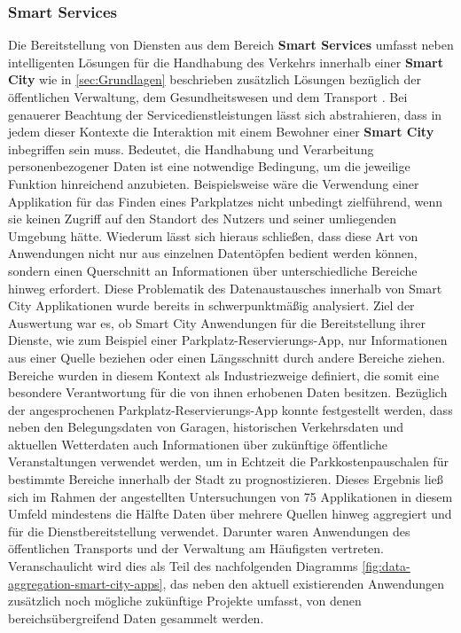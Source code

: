 \subsubsection{Smart Services}
\label{sec:Analyse der Datenerhebung:ssec:Smart City:sssec:Smart Services}

Die Bereitstellung von Diensten aus dem Bereich \textbf{Smart Services} umfasst neben intelligenten Lösungen für die Handhabung des Verkehrs innerhalb einer \textbf{Smart City} wie in \ref{sec:Grundlagen} beschrieben zusätzlich Lösungen bezüglich der öffentlichen Verwaltung, dem Gesundheitswesen und dem Transport \cite{SecPrivSmartCity2021}. Bei genauerer Beachtung der Servicedienstleistungen lässt sich abstrahieren, dass in jedem dieser Kontexte die Interaktion mit einem Bewohner einer \textbf{Smart City} inbegriffen sein muss.
Bedeutet, die Handhabung und Verarbeitung personenbezogener Daten ist eine notwendige Bedingung, um die jeweilige Funktion hinreichend anzubieten. Beispielsweise wäre die Verwendung einer Applikation für das Finden eines Parkplatzes nicht unbedingt zielführend, wenn sie keinen Zugriff auf den Standort des Nutzers und seiner umliegenden Umgebung hätte. 
Wiederum lässt sich hieraus schließen, dass diese Art von Anwendungen nicht nur aus einzelnen Datentöpfen bedient werden können, sondern einen Querschnitt an Informationen über unterschiedliche Bereiche hinweg erfordert. 
Diese Problematik des Datenaustausches innerhalb von Smart City Applikationen wurde bereits in \cite{BCG2020} schwerpunktmäßig analysiert. Ziel der Auswertung war es, ob Smart City Anwendungen für die Bereitstellung ihrer Dienste, wie zum Beispiel einer Parkplatz-Reservierungs-App, nur Informationen aus einer Quelle beziehen oder einen Längsschnitt durch andere Bereiche ziehen. 
Bereiche wurden in diesem Kontext als Industriezweige definiert, die somit eine besondere Verantwortung für die von ihnen erhobenen Daten besitzen. Bezüglich der angesprochenen Parkplatz-Reservierungs-App konnte festgestellt werden, dass neben den Belegungsdaten von Garagen, historischen Verkehrsdaten und aktuellen Wetterdaten auch Informationen über zukünftige öffentliche Veranstaltungen verwendet werden, um in Echtzeit die Parkkostenpauschalen für bestimmte Bereiche innerhalb der Stadt zu prognostizieren. 
Dieses Ergebnis ließ sich im Rahmen der angestellten Untersuchungen von 75 Applikationen in diesem Umfeld mindestens die Hälfte Daten über mehrere Quellen hinweg aggregiert und für die Dienstbereitstellung verwendet. 
Darunter waren Anwendungen des öffentlichen Transports und der Verwaltung am Häufigsten vertreten. Veranschaulicht wird dies als Teil des nachfolgenden Diagramms \ref{fig:data-aggregation-smart-city-apps}, das neben den aktuell existierenden Anwendungen zusätzlich noch mögliche zukünftige Projekte umfasst, von denen bereichsübergreifend Daten gesammelt werden.


